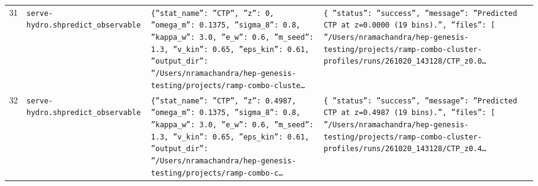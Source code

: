\documentclass[11pt,a4paper]{article}
\begin{document}
\begin{longtable}{@{}p{}p{}p{}p{}@{}}
31 & \texttt{serve-hydro.sh}\newline\texttt{predict\_\allowbreak{}observable} & \texttt{\{''stat\_\allowbreak{}name'':\allowbreak{} ''CTP'',\allowbreak{} ''z'':\allowbreak{} 0,\allowbreak{} ''omega\_\allowbreak{}m'':\allowbreak{} 0.1375,\allowbreak{} ''sigma\_\allowbreak{}8'':\allowbreak{} 0.8,\allowbreak{} ''kappa\_\allowbreak{}w'':\allowbreak{} 3.0,\allowbreak{} ''e\_\allowbreak{}w'':\allowbreak{} 0.6,\allowbreak{} ''m\_\allowbreak{}seed'':\allowbreak{} 1.3,\allowbreak{} ''v\_\allowbreak{}kin'':\allowbreak{} 0.65,\allowbreak{} ''eps\_\allowbreak{}kin'':\allowbreak{} 0.61,\allowbreak{} ''output\_\allowbreak{}dir'':\allowbreak{} ''/\allowbreak{}Users/\allowbreak{}nramachandra/\allowbreak{}hep-genesis-testing/\allowbreak{}projects/\allowbreak{}ramp-combo-cluste\ldots{}\allowbreak{}} & \texttt{\{   ''status'':\allowbreak{} ''success'',\allowbreak{}   ''message'':\allowbreak{} ''Predicted CTP at z=\allowbreak{}0.0000 (19 bins)\allowbreak{}.'',\allowbreak{}   ''files'':\allowbreak{} [     ''/\allowbreak{}Users/\allowbreak{}nramachandra/\allowbreak{}hep-genesis-testing/\allowbreak{}projects/\allowbreak{}ramp-combo-cluster-profiles/\allowbreak{}runs/\allowbreak{}261020\_\allowbreak{}143128/\allowbreak{}CTP\_\allowbreak{}z0.0\ldots{}\allowbreak{}} \\
32 & \texttt{serve-hydro.sh}\newline\texttt{predict\_\allowbreak{}observable} & \texttt{\{''stat\_\allowbreak{}name'':\allowbreak{} ''CTP'',\allowbreak{} ''z'':\allowbreak{} 0.4987,\allowbreak{} ''omega\_\allowbreak{}m'':\allowbreak{} 0.1375,\allowbreak{} ''sigma\_\allowbreak{}8'':\allowbreak{} 0.8,\allowbreak{} ''kappa\_\allowbreak{}w'':\allowbreak{} 3.0,\allowbreak{} ''e\_\allowbreak{}w'':\allowbreak{} 0.6,\allowbreak{} ''m\_\allowbreak{}seed'':\allowbreak{} 1.3,\allowbreak{} ''v\_\allowbreak{}kin'':\allowbreak{} 0.65,\allowbreak{} ''eps\_\allowbreak{}kin'':\allowbreak{} 0.61,\allowbreak{} ''output\_\allowbreak{}dir'':\allowbreak{} ''/\allowbreak{}Users/\allowbreak{}nramachandra/\allowbreak{}hep-genesis-testing/\allowbreak{}projects/\allowbreak{}ramp-combo-c\ldots{}\allowbreak{}} & \texttt{\{   ''status'':\allowbreak{} ''success'',\allowbreak{}   ''message'':\allowbreak{} ''Predicted CTP at z=\allowbreak{}0.4987 (19 bins)\allowbreak{}.'',\allowbreak{}   ''files'':\allowbreak{} [     ''/\allowbreak{}Users/\allowbreak{}nramachandra/\allowbreak{}hep-genesis-testing/\allowbreak{}projects/\allowbreak{}ramp-combo-cluster-profiles/\allowbreak{}runs/\allowbreak{}261020\_\allowbreak{}143128/\allowbreak{}CTP\_\allowbreak{}z0.4\ldots{}\allowbreak{}} \\

\end{longtable}
\end{document}
